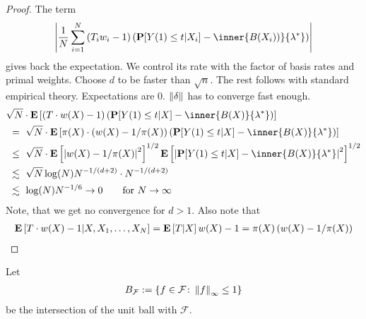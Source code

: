 \begin{proof}
The term 
\begin{gather}
    \left|  
  \frac{1}{N}
    \sum_{i=1}^{N} 
    \left( 
    T_i
    w_i
    -
    1
    \right)
    \left( 
    \P[Y(1)\le t | X_i]
    -
    \inner
    {B(X_i))}
    {\lambda^*}
    \right)
  \right|
\end{gather}
gives back the expectation. We control its rate 
with the factor of basis rates and primal weights.
Choose $d$ to be faster than $\sqrt{n}$.
The rest follows with standard empirical theory.
Expectations are 0.
$\left\lVert\delta\right\rVert$ has to converge fast enough.
\begin{align*}
  &
  \sqrt{N}
  \cdot
  \E
  \left[ 
    \left( 
    T
    \cdot
    w(X)
    -
    1
    \right)
    \left( 
      \P
      [
      Y(1)\le t
      |X
      ]
      -
      \inner
      {B(X)}
      {\lambda^*}
    \right)
  \right]
  \\
  &
  \ 
  =
  \ 
  \sqrt{N}
  \cdot
  \E
  \left[ 
    \pi(X)
    \cdot
    \left( 
    w(X)
    -
    1
    /
    \pi(X)
    \right)
    \left( 
      \P
      [
      Y(1)\le t
      |X
      ]
      -
      \inner
      {B(X)}
      {\lambda^*}
    \right)
  \right]
  \\
  &
  \ 
  \le
  \ 
  \sqrt{N}
  \cdot
  \E
  \left[ 
    \left| 
    w(X)
    -
    1
    /
    \pi(X)
    \right|
    ^2
    \right]
    ^{1/2}
  \E
  \left[ 
    \left| 
      \P
      [
      Y(1)\le t
      |X
      ]
      -
      \inner
      {B(X)}
      {\lambda^*}
    \right|
    ^2
    \right]
    ^{1/2}
    \\
  &
  \ 
  \lesssim
  \ 
  \sqrt{N}
  \log(N)
  N^{-1/(d+2)}
  \cdot
  N^{-1/(d+2)}
    \\
  &
  \ 
  \lesssim
  \ 
  \log(N)
  N^{-1/6}
  \to 0
  \qquad
  \text{for}\ 
  N\to\infty
\end{align*}
Note, that we get no convergence for $d>1$. 
Also note that
\begin{gather*}
  \mathbf{E}
  \left[ 
    T
    \cdot
    w(X)
    -
    1
    |
    X,
    X_1,
    \ldots,
    X_N
    \right]
    =
  \mathbf{E}
  \left[ 
    T
    |
    X
    \right]
    w(X)
    -
    1
    =
    \pi(X)
    \left( 
      w(X)
      -
      1/\pi(X)
    \right)
\end{gather*}
\end{proof}
Let 
\begin{gather}
  B_{\mathcal{F}}
  :=
  \left\{ 
    f\in \mathcal{F}
    \colon
    \left\lVert f\right\rVert_\infty
    \le
    1
  \right\}
\end{gather}
be the intersection of the unit ball with $\mathcal{F}$.

